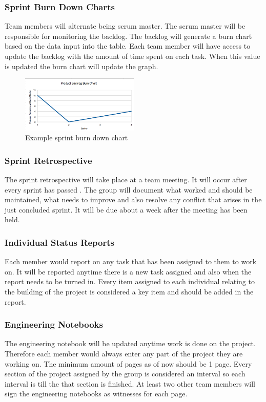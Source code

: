\subsubsection{Sprint Burn Down Charts}
Team members will alternate being scrum master. The scrum master will be responsible for monitoring the backlog. The backlog will generate a burn chart based on the data input into the table. Each team member will have access to update the backlog with the amount of time spent on each task. When this value is updated the burn chart will update the graph.

\begin{figure}[h!]
    \centering
    \includegraphics[width=0.5\textwidth]{images/burn_down_chart_example}
    \caption{Example sprint burn down chart}
\end{figure}

\subsubsection{Sprint Retrospective}
The sprint retrospective will take place at a team meeting. It will occur after every sprint has passed . The group will document what worked and should be maintained, what needs to improve and also resolve any conflict that arises in the just concluded sprint. It will be due about a week after the meeting has been held.

\subsubsection{Individual Status Reports}
Each member would report on any task that has been assigned to them to work on. It will be reported anytime there is a new task assigned and also when the report needs to be turned in. Every item assigned to each individual relating to the building of the project is considered a key item and should be added in the report.

\subsubsection{Engineering Notebooks}
The engineering notebook will be updated anytime work is done on the project. Therefore each member would always enter any part of the project they are working on. The minimum amount of pages as of now should be 1 page. Every section of the project assigned by the group is considered an interval so each interval is till the that section is finished. At least two other team members will sign the engineering notebooks as witnesses for each page.

